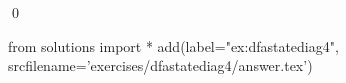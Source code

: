 
\begin{ex} 
  \label{ex:dfastatediag4}
  
  \qed
\end{ex} 
\begin{python0}
from solutions import *
add(label="ex:dfastatediag4",
    srcfilename='exercises/dfastatediag4/answer.tex') 
\end{python0}
